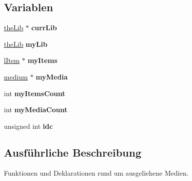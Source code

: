 \subsection*{Variablen}
\begin{DoxyCompactItemize}
\item 
\hyperlink{structthe_lib}{the\+Lib} $\ast$ {\bfseries curr\+Lib}\hypertarget{group___lend_lib_item_ga6bbfd8892332fc494fc1b0b17b9a86e2}{}\label{group___lend_lib_item_ga6bbfd8892332fc494fc1b0b17b9a86e2}

\item 
\hyperlink{structthe_lib}{the\+Lib} {\bfseries my\+Lib}\hypertarget{group___lend_lib_item_ga32c74121be73b5f3f3d3cec6e72e69d3}{}\label{group___lend_lib_item_ga32c74121be73b5f3f3d3cec6e72e69d3}

\item 
\hyperlink{group___lend_lib_item_ga307bf11439a9dddcff69d464ae8df92b}{l\+Item} $\ast$ {\bfseries my\+Items}\hypertarget{group___lend_lib_item_gad6e28ef64662b64775e19a257bf13ad0}{}\label{group___lend_lib_item_gad6e28ef64662b64775e19a257bf13ad0}

\item 
\hyperlink{structmedium}{medium} $\ast$ {\bfseries my\+Media}\hypertarget{group___lend_lib_item_gad4624d52a861d3f5e055478cb9c37980}{}\label{group___lend_lib_item_gad4624d52a861d3f5e055478cb9c37980}

\item 
int {\bfseries my\+Items\+Count}\hypertarget{group___lend_lib_item_ga9c0ae206c5f3c1a32933802b0e2bfdc1}{}\label{group___lend_lib_item_ga9c0ae206c5f3c1a32933802b0e2bfdc1}

\item 
int {\bfseries my\+Media\+Count}\hypertarget{group___lend_lib_item_gaeae1fc4ce16ddf58fc261aba9de69fde}{}\label{group___lend_lib_item_gaeae1fc4ce16ddf58fc261aba9de69fde}

\item 
unsigned int {\bfseries idc}\hypertarget{group___lend_lib_item_ga21662b3d358b2e6dba37f83c15f4a715}{}\label{group___lend_lib_item_ga21662b3d358b2e6dba37f83c15f4a715}

\end{DoxyCompactItemize}


\subsection{Ausführliche Beschreibung}
Funktionen und Deklarationen rund um ausgeliehene Medien. 



